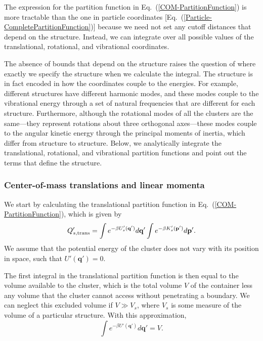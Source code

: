 \documentclass[pre, aps, twocolumn, reprint, amsmath,amssymb, showpacs,
superscriptaddress] {revtex4-1}
\begin{document}
The expression for the partition function in
Eq.~(\ref{COM-PartitionFunction}) is more tractable than the one in
particle coordinates [Eq.~(\ref{Particle-CompletePartitionFunction})]
because we need not set any cutoff distances that depend on the
structure. Instead, we can integrate over all possible values of the
translational, rotational, and vibrational coordinates.

The absence of bounds that depend on the structure raises the question
of where exactly we specify the structure when we calculate the
integral. The structure is in fact encoded in how the coordinates couple
to the energies. For example, different structures have different
harmonic modes, and these modes couple to the vibrational energy through
a set of natural frequencies that are different for each structure.
Furthermore, although the rotational modes of all the clusters are the
same---they represent rotations about three orthogonal axes---these
modes couple to the angular kinetic energy through the principal moments
of inertia, which differ from structure to structure. Below, we
analytically integrate the translational, rotational, and vibrational
partition functions and point out the terms that define the structure.


\subsubsection{Center-of-mass translations and linear momenta}
We start by calculating the translational partition function in
Eq.~(\ref{COM-PartitionFunction}), which is given by
\begin{equation*}
Q_{s, \textnormal{trans}}' = \int e^{-\beta U'_s(\mathbf{q}')} d\mathbf{q}' 
\int e^{-\beta K'_s(\mathbf{p}')} d\mathbf{p}'.
\end{equation*}
We assume that the potential energy of the cluster does not vary with
its position in space, such that $U'(\mathbf{q}')=0$.

The first integral in the translational partition function is then equal
to the volume available to the cluster, which is the total volume $V$ of
the container less any volume that the cluster cannot access without
penetrating a boundary. We can neglect this excluded volume if $V \gg
V_s$, where $V_s$ is some measure of the volume of a particular
structure. With this approximation,
\begin{equation*}
  \int e^{-\beta U'(\mathbf{q}')} d\mathbf{q}' = V.
\end{equation*}
\end{document}
